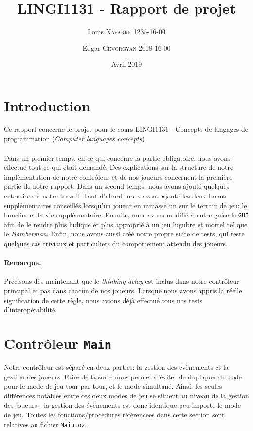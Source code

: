 \documentclass{article}
\title{LINGI1131 - Rapport de projet}
\author{Louis \textsc{Navarre} 1235-16-00 \and Edgar \textsc{Gevorgyan} 2018-16-00}
\date{Avril 2019}
\begin{document}
\maketitle

\section{Introduction}
Ce rapport concerne le projet pour le cours LINGI1131 - Concepts de langages de programmation (\emph{Computer languages concepts}). \\ \\
Dans un premier temps, en ce qui concerne la partie obligatoire, nous avons effectué tout ce qui était demandé. Des explications sur la structure de notre implémentation de notre contrôleur et de nos joueurs concernent la première partie de notre rapport. Dans un second temps, nous avons ajouté quelques extensions à notre travail. Tout d'abord, nous avons ajouté les deux bonus supplémentaires conseillés lorsqu'un joueur en ramasse un sur le terrain de jeu: le bouclier et la vie supplémentaire. Ensuite, nous avons modifié à notre guise le \texttt{GUI} afin de le rendre plus ludique et plus approprié à un jeu lugubre et mortel tel que le \emph{Bomberman}. Enfin, nous avons aussi créé notre propre suite de tests, qui teste quelques cas triviaux et particuliers du comportement attendu des joueurs.
\paragraph{Remarque.}Précisons dès maintenant que le \emph{thinking delay} est inclus dans notre contrôleur principal et pas dans chacun de nos joueurs. Lorsque nous avons appris la réelle signification de cette règle, nous avions déjà effectué tous nos tests d'interopérabilité.

\section{Contrôleur \texttt{Main}}
Notre contrôleur est séparé en deux parties: la gestion des évènements et la gestion des joueurs. Faire de la sorte nous permet d'éviter de dupliquer du code pour le mode de jeu tour par tour, et le mode simultané. Ainsi, les seules différences notables entre ces deux modes de jeu se situent au niveau de la gestion des joueurs - la gestion des évènements est donc identique peu importe le mode de jeu. Toutes les fonctions/procédures référencées dans cette section sont relatives au fichier \texttt{Main.oz}.
\end{document}
